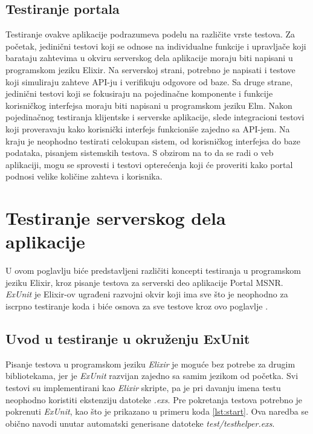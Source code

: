 \documentclass[12pt,oneside]{memoir}
\begin{document}
\section{Testiranje portala}
\par Testiranje ovakve aplikacije podrazumeva podelu na različite vrste testova. Za početak, jedinični testovi koji se odnose na individualne funkcije i upravljače koji barataju zahtevima u okviru serverskog dela aplikacije moraju biti napisani u programskom jeziku Elixir. Na serverskoj strani, potrebno je napisati i testove koji simuliraju zahteve API-ju i verifikuju odgovore od baze. Sa druge strane, jedinični testovi koji se fokusiraju na pojedinačne komponente i funkcije korisničkog interfejsa moraju biti napisani u programskom jeziku Elm. Nakon pojedinačnog testiranja klijentske i serverske aplikacije, slede integracioni testovi koji proveravaju kako korisnički interfejs funkcioniše zajedno sa API-jem. Na kraju je neophodno testirati celokupan sistem, od korisničkog interfejsa do baze podataka, pisanjem sistemskih testova. S obzirom na to da se radi o veb aplikaciji, mogu se sprovesti i testovi opterećenja koji će proveriti kako portal podnosi velike količine zahteva i korisnika. 

\chapter{Testiranje serverskog dela aplikacije}
\label{chp:elixir}

\par U ovom poglavlju biće predstavljeni različiti koncepti testiranja u programskom jeziku Elixir, kroz pisanje testova za serverski deo aplikacije Portal MSNR. \textit{ExUnit} je Elixir-ov ugrađeni razvojni okvir koji ima sve što je neophodno za iscrpno testiranje koda i biće osnova za sve testove kroz ovo poglavlje \cite{exunit}.

\section{Uvod u testiranje u okruženju ExUnit}
\label{sec:elixunit}

\par Pisanje testova u programskom jeziku \emph{Elixir} je moguće bez potrebe za drugim bibliotekama, jer je \emph{ExUnit} razvijan zajedno sa samim jezikom od početka. Svi testovi su implementirani kao \emph{Elixir} skripte, pa je pri davanju imena testu neophodno koristiti ekstenziju datoteke \emph{.exs}. Pre pokretanja testova potrebno je pokrenuti \emph{ExUnit}, kao što je prikazano u primeru koda \ref{lst:start}. Ova naredba se obično navodi unutar automatski generisane datoteke \emph{test/test{\textunderscore}helper.exs}. 
\end{document}
